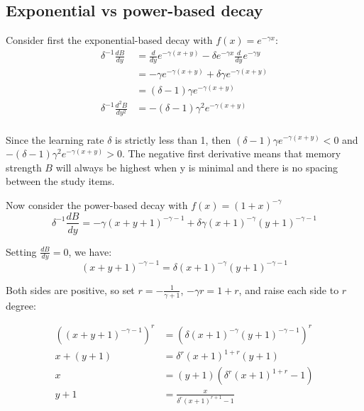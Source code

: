 \documentclass[man, 12pt, floatsintext]{apa6}
\theoremstyle{definition}
\theoremstyle{remark}
\begin{document}
\subsection{Exponential vs power-based decay}

Consider first the exponential-based decay with $f(x) = e^{-\gamma x}$:
\begin{equation}
  \begin{aligned}
    \delta^{-1}\frac{dB}{dy} &= \frac{d}{dy} e^{-\gamma(x+y)} - \delta e^{-\gamma x} \frac{d}{dy}e^{-\gamma y} \\
    &= -\gamma e^{-\gamma(x+y)} + \delta \gamma e^{-\gamma (x+y)} \\
    &= (\delta-1) \gamma e^{-\gamma (x+y)}\\
    \delta^{-1}\frac{d^2 B}{dy^2} &= - (\delta-1) \gamma^2 e^{-\gamma (x+y)}\\
  \end{aligned}
\end{equation}

Since the learning rate $\delta$ is strictly less than 1, then $(\delta-1) \gamma e^{-\gamma (x+y)} < 0$ and $- (\delta-1) \gamma^2 e^{-\gamma (x+y)} > 0$. The negative first derivative means that memory strength $B$ will always be highest when y is minimal and there is no spacing between the study items.

Now consider the power-based decay with $f(x) = (1+x)^{-\gamma}$
\begin{equation}
  \delta^{-1}\frac{dB}{dy} = -\gamma (x+y+1)^{-\gamma-1} + \delta \gamma(x+1)^{-\gamma} (y+1)^{-\gamma-1}
\end{equation}

Setting $\frac{dB}{dy}=0$, we have:
\begin{equation}
  (x+y+1)^{-\gamma-1} = \delta(x+1)^{-\gamma} (y+1)^{-\gamma-1}
\end{equation}

Both sides are positive, so set $r = -\frac{1}{\gamma+1}$, $-\gamma r = 1+r$, and raise each side to $r$ degree:

\begin{equation}
  \begin{aligned}
    ((x+y+1)^{-\gamma-1})^{r} &= (\delta(x+1)^{-\gamma} (y+1)^{-\gamma-1})^{r} \\
    x+(y+1) &= \delta ^{r} (x+1)^{1+r} (y+1) \\
    x &= (y+1)(\delta ^{r} (x+1)^{1+r}-1) \\
    y + 1 &= \frac{x}{\delta ^{r} (x+1)^{r+1}-1}
  \end{aligned}
\end{equation}
\end{document}
